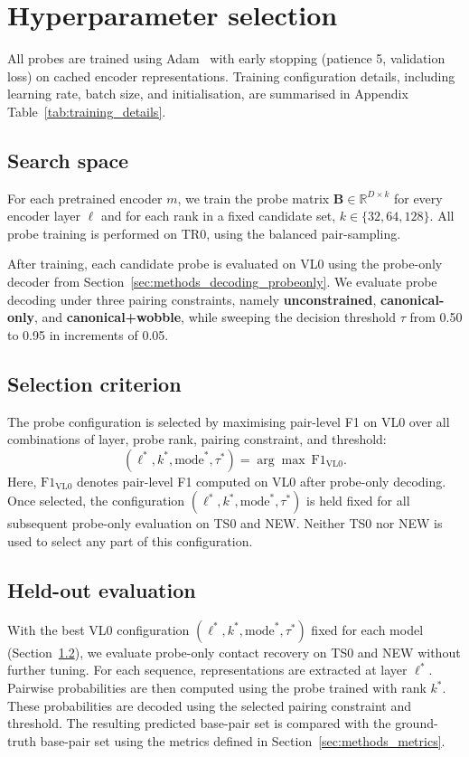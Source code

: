 \documentclass[logo,bsc,singlespacing,parskip]{infthesis}
\begin{document}
\section{Hyperparameter selection}
\label{sec:exp_selection}
All probes are trained using Adam~\citep{kingma2015adam} with early
stopping (patience 5, validation loss) on cached encoder
representations. Training configuration details, including learning
rate, batch size, and initialisation, are summarised in
Appendix Table~\ref{tab:training_details}.

\subsection{Search space}
\label{sec:exp_selection_space}
For each pretrained encoder $m$, we train the probe matrix
$\mathbf{B}\in\mathbb{R}^{D\times k}$ for every encoder layer $\ell$ and for
each rank in a fixed candidate set, $k \in \{32,64,128\}$.
All probe training is performed on TR0, using the balanced pair-sampling.

After training, each candidate probe is evaluated on VL0 using the
probe-only decoder from
Section~\ref{sec:methods_decoding_probeonly}. 
We evaluate probe decoding under three pairing constraints, namely \textbf{unconstrained}, \textbf{canonical-only}, and \textbf{canonical+wobble}, while sweeping the decision threshold $\tau$ from 0.50 to 0.95 in increments of 0.05.

\subsection{Selection criterion}
\label{sec:exp_selection_criterion}
The probe configuration is selected by maximising pair-level F1 on VL0
over all combinations of layer, probe rank, pairing constraint, and threshold:
\begin{equation}
(\ell^\ast, k^\ast, \mathrm{mode}^\ast, \tau^\ast)
=
\arg\max \ \mathrm{F1}_{\mathrm{VL0}}.
\end{equation}
Here, $\mathrm{F1}_{\mathrm{VL0}}$ denotes pair-level F1 computed on VL0 after probe-only decoding. Once selected, the configuration $(\ell^\ast, k^\ast, \mathrm{mode}^\ast, \tau^\ast)$ is
held fixed for all subsequent probe-only evaluation on TS0 and NEW.
Neither TS0 nor NEW is used to select any part of this configuration.

\subsection{Held-out evaluation}
\label{sec:exp_probe_only_eval}
With the best VL0 configuration
$(\ell^\ast, k^\ast, \mathrm{mode}^\ast, \tau^\ast)$ fixed for each model
(Section~\ref{sec:exp_selection_criterion}), we evaluate probe-only
contact recovery on TS0 and NEW without further tuning. For each sequence, representations are extracted at layer $\ell^\ast$. Pairwise probabilities are then computed using the probe trained with rank $k^\ast$. These probabilities are decoded using the selected pairing constraint and threshold. The resulting predicted base-pair set is compared with the ground-truth base-pair set using the metrics defined in Section~\ref{sec:methods_metrics}.
\end{document}
